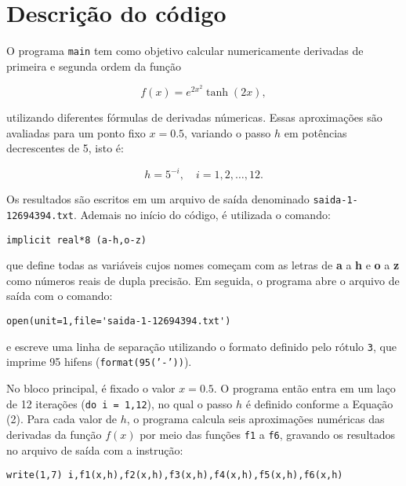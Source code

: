 \newpage
\section*{Descrição do código}
O programa \texttt{main} tem como objetivo calcular numericamente 
derivadas de primeira e segunda ordem da função

\begin{equation}
	f(x) = e^{2x^2} \tanh(2x),
\end{equation}

\noindent 
utilizando diferentes fórmulas de derivadas númericas.  
Essas aproximações são avaliadas para um ponto fixo $x = 0.5$, 
variando o passo $h$ em potências decrescentes de 5, isto é:

\begin{equation}
	h = 5^{-i}, \quad i = 1, 2, \ldots, 12.
\end{equation}

\noindent
Os resultados são escritos em um arquivo de saída denominado 
\texttt{saida-1-12694394.txt}. Ademais no início do código, é 
utilizada o comando:

\vspace*{1\baselineskip}
\begin{lstlisting}
implicit real*8 (a-h,o-z)
\end{lstlisting}

\noindent
que define todas as variáveis cujos nomes começam com as letras 
de \textbf{a} a \textbf{h} e \textbf{o} a \textbf{z}  como números reais de dupla precisão.
Em seguida, o programa abre o arquivo de saída com o comando:

\vspace*{1\baselineskip}
\begin{lstlisting}
open(unit=1,file='saida-1-12694394.txt')
\end{lstlisting}

\noindent
e escreve uma linha de separação utilizando o formato definido 
pelo rótulo \texttt{3}, que imprime 95 hifens 
(\texttt{format(95('-'))}).

No bloco principal, é fixado o valor $x = 0.5$.  
O programa então entra em um laço de 12 iterações 
(\texttt{do i = 1,12}), no qual o passo $h$ é definido conforme 
a Equação (2). Para cada valor de $h$, o programa calcula seis aproximações 
numéricas das derivadas da função $f(x)$ por meio das funções 
\texttt{f1} a \texttt{f6}, gravando os resultados no arquivo de 
saída com a instrução:

\vspace*{1\baselineskip}
\begin{lstlisting}
write(1,7) i,f1(x,h),f2(x,h),f3(x,h),f4(x,h),f5(x,h),f6(x,h)
\end{lstlisting}

